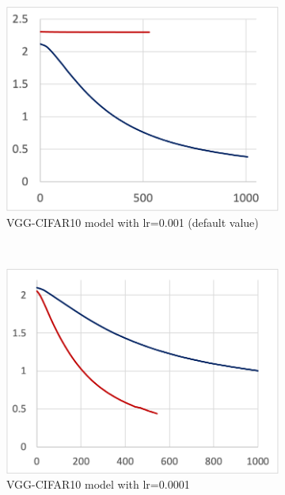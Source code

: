 \begin{figure}[!ht]
  \centering
  \begin{subfigure}[t]{.24\textwidth}
    \includegraphics[width=\textwidth]{keras-cifar}
    \caption{VGG-CIFAR10 model with lr=0.001 (default value)}
  \end{subfigure}
  ~
  \begin{subfigure}[t]{.24\textwidth}
    \includegraphics[width=\textwidth]{cifar-1e4}
    \caption{VGG-CIFAR10 model with lr=0.0001}
  \end{subfigure} 
  ~ 
  \begin{subfigure}[t]{.24\textwidth}

\end{subfigure}
\end{figure}
